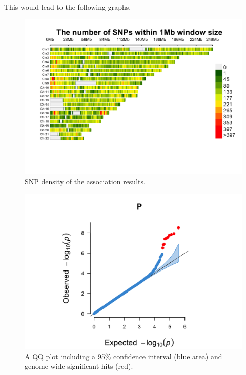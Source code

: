 \documentclass[
]{book}
\begin{document}
This would lead to the following graphs.

\begin{figure}

{\centering \includegraphics[width=18.67in]{img/_gwas_wtccc/WTCCC1ResultsManhattan-density} 

}

\caption{SNP density of the association results.}\label{fig:show-wtccc1-graphs-density}
\end{figure}

\begin{figure}

{\centering \includegraphics[width=18.67in]{img/_gwas_wtccc/WTCCC1ResultsManhattan-qq} 

}

\caption{A QQ plot including a 95\% confidence interval (blue area) and genome-wide significant hits (red).}\label{fig:show-wtccc1-graphs-qq}
\end{figure}
\end{document}
